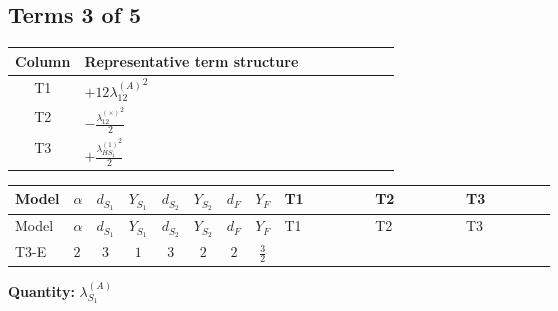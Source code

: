 \documentclass[8pt]{article}
\begin{document}
\begin{landscape}
\subsection*{Terms 3 of 5}
\begin{center}
\begin{tabular}{@{}c >{\raggedright\arraybackslash}p{0.82\linewidth}@{}}
\toprule
Column & Representative term structure \\
\midrule
T1 & \(\displaystyle +12 {\lambda_{12}^{(A)}}^2\) \\
\midrule
T2 & \(\displaystyle -\frac{{\lambda_{12}^{(\times)}}^2}{2}\) \\
\midrule
T3 & \(\displaystyle +\frac{{\lambda_{HS_1}^{(1)}}^2}{2}\) \\
\midrule
\bottomrule
\end{tabular}
\end{center}
\smallskip
\tiny
\begin{longtable}{@{}llcccccc >{\raggedright\arraybackslash}p{0.21\linewidth} >{\raggedright\arraybackslash}p{0.21\linewidth} >{\raggedright\arraybackslash}p{0.21\linewidth}@{}}
\toprule
Model & $\alpha$ & $d_{S_1}$ & $Y_{S_1}$ & $d_{S_2}$ & $Y_{S_2}$ & $d_F$ & $Y_F$ & T1 & T2 & T3 \\
\midrule
\endfirsthead
\toprule
Model & $\alpha$ & $d_{S_1}$ & $Y_{S_1}$ & $d_{S_2}$ & $Y_{S_2}$ & $d_F$ & $Y_F$ & T1 & T2 & T3 \\
\midrule
\endhead
T3-E & $2$ & $3$ & $1$ & $3$ & $2$ & $2$ & $\frac{3}{2}$ & \scriptsize\adjustbox{max width=\linewidth}{$\begin{gathered} +12 {\lambda_{12}^{(A)}}^2\end{gathered}$} & \scriptsize\adjustbox{max width=\linewidth}{$\begin{gathered} -\frac{{\lambda_{12}^{(\times)}}^2}{2}\end{gathered}$} & \scriptsize\adjustbox{max width=\linewidth}{$\begin{gathered} +\frac{{\lambda_{HS_1}^{(1)}}^2}{2}\end{gathered}$} \\
\midrule
\bottomrule
\end{longtable}
\clearpage
\noindent\textbf{Quantity: }$\lambda_{S_1}^{(A)}$\par\smallskip

\end{landscape}
\end{document}
